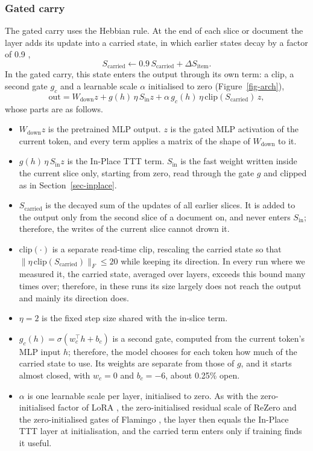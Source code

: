 \documentclass[10pt]{article} %
\begin{document}
\subsubsection{Gated carry}
\label{sec-gated}
The gated carry uses the Hebbian rule. At the end of each slice or document the layer adds its update into a carried state, in which earlier states decay by a factor of 0.9 \citep{ba2016using},
\begin{equation}
  S_{\mathrm{carried}} \leftarrow 0.9\, S_{\mathrm{carried}} + \Delta S_{\mathrm{item}} .
\end{equation}
In the gated carry, this state enters the output through its own term: a clip, a second gate $g_c$ and a learnable scale $\alpha$ initialised to zero (Figure~\ref{fig-arch}),
\begin{equation}
  \mathrm{out} = W_{\mathrm{down}} z + g(h)\, \eta\, S_{\mathrm{in}} z + \alpha\, g_c(h)\, \eta\, \mathrm{clip}(S_{\mathrm{carried}})\, z ,
\end{equation}
whose parts are as follows.
\begin{itemize}
  \item $W_{\mathrm{down}} z$ is the pretrained MLP output. $z$ is the gated MLP activation of the current token, and every term applies a matrix of the shape of $W_{\mathrm{down}}$ to it.
  \item $g(h)\, \eta\, S_{\mathrm{in}} z$ is the In-Place TTT term. $S_{\mathrm{in}}$ is the fast weight written inside the current slice only, starting from zero, read through the gate $g$ and clipped as in Section~\ref{sec-inplace}.
  \item $S_{\mathrm{carried}}$ is the decayed sum of the updates of all earlier slices. It is added to the output only from the second slice of a document on, and never enters $S_{\mathrm{in}}$; therefore, the writes of the current slice cannot drown it.
  \item $\mathrm{clip}(\cdot)$ is a separate read-time clip, rescaling the carried state so that $\lVert \eta\, \mathrm{clip}(S_{\mathrm{carried}}) \rVert_F \le 20$ while keeping its direction. In every run where we measured it, the carried state, averaged over layers, exceeds this bound many times over; therefore, in these runs its size largely does not reach the output and mainly its direction does.
  \item $\eta = 2$ is the fixed step size shared with the in-slice term.
  \item $g_c(h) = \sigma(w_c^\top h + b_c)$ is a second gate, computed from the current token's MLP input $h$; therefore, the model chooses for each token how much of the carried state to use. Its weights are separate from those of $g$, and it starts almost closed, with $w_c = 0$ and $b_c = -6$, about 0.25\% open.
  \item $\alpha$ is one learnable scale per layer, initialised to zero. As with the zero-initialised factor of LoRA \citep{hu2022lora}, the zero-initialised residual scale of ReZero \citep{bachlechner2021rezero} and the zero-initialised gates of Flamingo \citep{alayrac2022flamingo}, the layer then equals the In-Place TTT layer at initialisation, and the carried term enters only if training finds it useful.
\end{itemize}
\end{document}
